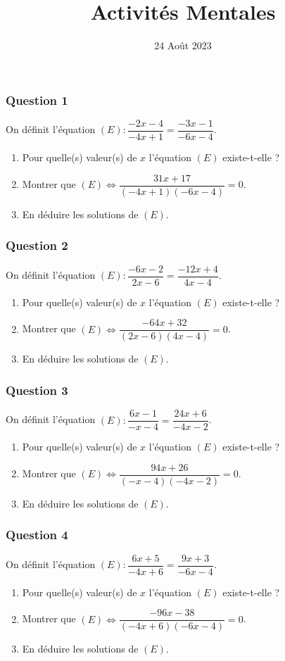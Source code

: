 \documentclass[15pt, mathserif]{beamer}
\title{Activités Mentales}
\date{24 Août 2023}
\begin{document}
\begin{frame}
    \titlepage
\end{frame}

\begin{frame} 
	\frametitle{Question 1}
On définit l'équation $(E):\dfrac{-2x-4}{-4x+1}=\dfrac{-3x-1}{-6x-4}$. 
 \begin{enumerate} 
 	 \item Pour quelle(s) valeur(s) de $x$ l'équation $(E)$ existe-t-elle ? 
 	 \item Montrer que $(E) \Leftrightarrow \dfrac{31x+17}{(-4x+1)(-6x-4)}=0$. 
 	 \item En déduire les solutions de $(E)$. 
 \end{enumerate}\end{frame}


\begin{frame} 
	\frametitle{Question 2}
On définit l'équation $(E):\dfrac{-6x-2}{2x-6}=\dfrac{-12x+4}{4x-4}$. 
 \begin{enumerate} 
 	 \item Pour quelle(s) valeur(s) de $x$ l'équation $(E)$ existe-t-elle ? 
 	 \item Montrer que $(E) \Leftrightarrow \dfrac{-64x+32}{(2x-6)(4x-4)}=0$. 
 	 \item En déduire les solutions de $(E)$. 
 \end{enumerate}\end{frame}


\begin{frame} 
	\frametitle{Question 3}
On définit l'équation $(E):\dfrac{6x-1}{-x-4}=\dfrac{24x+6}{-4x-2}$. 
 \begin{enumerate} 
 	 \item Pour quelle(s) valeur(s) de $x$ l'équation $(E)$ existe-t-elle ? 
 	 \item Montrer que $(E) \Leftrightarrow \dfrac{94x+26}{(-x-4)(-4x-2)}=0$. 
 	 \item En déduire les solutions de $(E)$. 
 \end{enumerate}\end{frame}


\begin{frame} 
	\frametitle{Question 4}
On définit l'équation $(E):\dfrac{6x+5}{-4x+6}=\dfrac{9x+3}{-6x-4}$. 
 \begin{enumerate} 
 	 \item Pour quelle(s) valeur(s) de $x$ l'équation $(E)$ existe-t-elle ? 
 	 \item Montrer que $(E) \Leftrightarrow \dfrac{-96x-38}{(-4x+6)(-6x-4)}=0$. 
 	 \item En déduire les solutions de $(E)$. 
 \end{enumerate}\end{frame}
\end{document}
